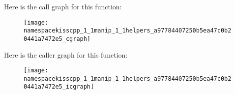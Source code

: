 Here is the call graph for this function\-:
\nopagebreak
\begin{figure}[H]
\begin{center}
\leavevmode
\texttt{[image: namespacekisscpp\_1\_1manip\_1\_1helpers\_a97784407250b5ea47c0b20441a7472e5\_cgraph]}
\end{center}
\end{figure}




Here is the caller graph for this function\-:
\nopagebreak
\begin{figure}[H]
\begin{center}
\leavevmode
\texttt{[image: namespacekisscpp\_1\_1manip\_1\_1helpers\_a97784407250b5ea47c0b20441a7472e5\_icgraph]}
\end{center}
\end{figure}


